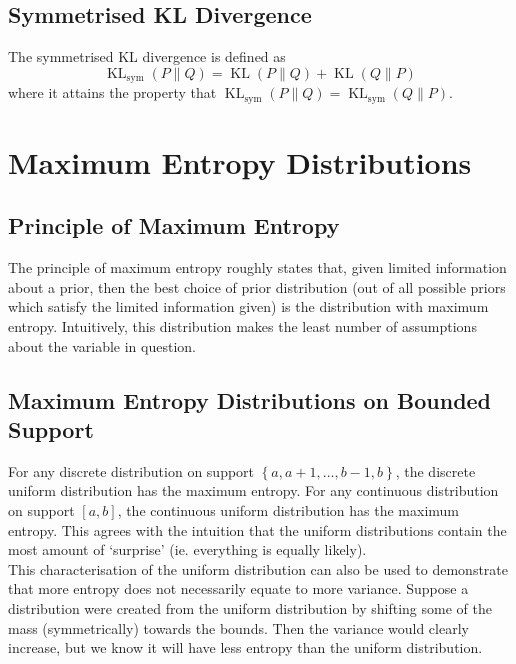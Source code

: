 \documentclass[11pt]{report} %
\begin{document}
\subsection{Symmetrised KL Divergence}

The symmetrised KL divergence is defined as
\begin{equation}
\operatorname{KL}_{\mathrm{sym}}\left(P\middle\|Q\right) = \operatorname{KL}\left(P\middle\|Q\right) + \operatorname{KL}\left(Q\middle\|P\right)
\end{equation}
where it attains the property that $\operatorname{KL}_{\mathrm{sym}}\left(P\middle\|Q\right) = \operatorname{KL}_{\mathrm{sym}}\left(Q\middle\|P\right)$.

\section{Maximum Entropy Distributions}

\subsection{Principle of Maximum Entropy}

The principle of maximum entropy roughly states that, given limited information about a prior, then the best choice of prior distribution (out of all possible priors which satisfy the limited information given) is the distribution with maximum entropy. Intuitively, this distribution makes the least number of assumptions about the variable in question.

\subsection{Maximum Entropy Distributions on Bounded Support}

For any discrete distribution on support $\left\{a, a + 1, \dots, b - 1, b\right\}$, the discrete uniform distribution has the maximum entropy. For any continuous distribution on support $\left[a, b\right]$, the continuous uniform distribution has the maximum entropy. This agrees with the intuition that the uniform distributions contain the most amount of `surprise' (ie. everything is equally likely). \\

This characterisation of the uniform distribution can also be used to demonstrate that more entropy does not necessarily equate to more variance. Suppose a distribution were created from the uniform distribution by shifting some of the mass (symmetrically) towards the bounds. Then the variance would clearly increase, but we know it will have less entropy than the uniform distribution.
\end{document}

